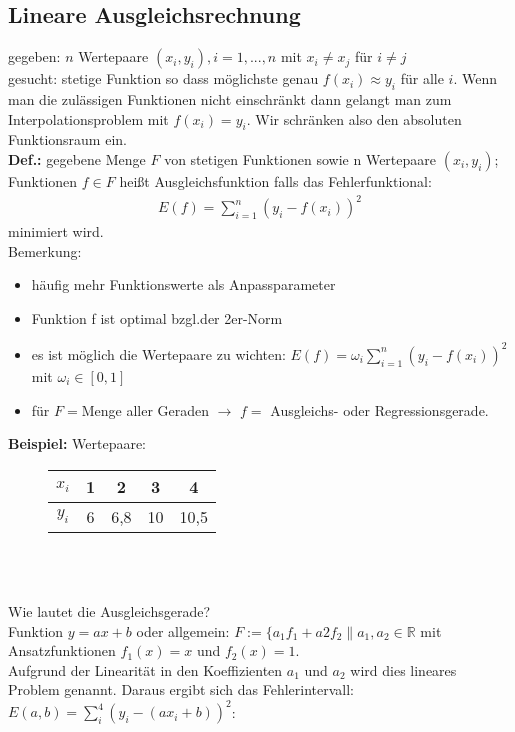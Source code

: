 \documentclass{scrartcl}
\begin{document}
\subsection{Lineare Ausgleichsrechnung}
gegeben: $n$ Wertepaare $(x_i,y_i), i=1,...,n$ mit $x_i \neq x_j$ für $i \neq j$ \\
gesucht: stetige Funktion so dass möglichste genau $f(x_i) \approx y_i$ für alle $i$.
Wenn man die zulässigen Funktionen nicht einschränkt dann gelangt man zum Interpolationsproblem mit $f(x_i)=y_i$.
Wir schränken also den absoluten Funktionsraum ein.\\
\textbf{Def.:} gegebene Menge $F$ von stetigen Funktionen sowie n Wertepaare $(x_i, y_i)$; Funktionen $f \in F$ heißt Ausgleichsfunktion falls das Fehlerfunktional:
\begin{align*}
E(f)= \sum_{i=1}^n (y_i-f(x_i))^2
\end{align*}
minimiert wird.\\
Bemerkung: \begin{itemize}
\item häufig mehr Funktionswerte als Anpassparameter
\item Funktion f ist optimal bzgl.der 2er-Norm
\item es ist möglich die Wertepaare zu wichten: $E(f)= \omega_i \sum_{i=1}^n (y_i-f(x_i))^2$ mit $\omega_i \in [0,1]$
\item für $F=$Menge aller Geraden $\rightarrow$ $f=$ Ausgleichs- oder Regressionsgerade.
\end{itemize}
\textbf{Beispiel:}
Wertepaare: \begin{figure}
\center

\begin{tabular}{|c||c|c|c|c|}

$x_i$ & 1 & 2 & 3 & 4 \\ 
\hline 
$y_i$ & 6 & 6,8 & 10 & 10,5 \\ 

\end{tabular}\\  
\end{figure}
\\
Wie lautet die Ausgleichsgerade? \\
Funktion $y=a x +b$ oder allgemein: $F:=\{a_1 f_1+a2 f_2\|a_1,a_2 \in \mathbb{R}$ mit Ansatzfunktionen $f_1(x)=x$ und $f_2(x)=1$.\\
Aufgrund der Linearität in den Koeffizienten $a_1$ und $a_2$ wird dies lineares Problem genannt.
Daraus ergibt sich das Fehlerintervall: $E(a,b)=\sum_i^4(y_i-(a x_i+b))^2$:
\end{document}

